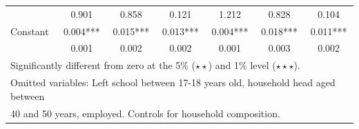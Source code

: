 \begin{table}
\begin{tabular}{l|ccc|ccc}
                    	&	       0.901   	&	0.858	&	0.121	&	       1.212   	&	0.828	&	0.104	\\				
Constant            	&	       0.004***	&	       0.015***	&	       0.013***	&	       0.004***	&	       0.018***	&	       0.011***	\\				
                    	&	       0.001   	&	0.002	&	0.002	&	       0.001   	&	0.003	&	0.002	\\
\hline\hline
\multicolumn{7}{l}{Significantly different from zero at the 5\% ($\star\star$) and 1\% level ($\star\star\star$).} \\
\multicolumn{7}{l}{Omitted variables: Left school between 17-18 years old, household head aged between} \\
\multicolumn{7}{l}{40 and 50 years, employed. Controls for household composition.}
\end{tabular}
\end{table}

